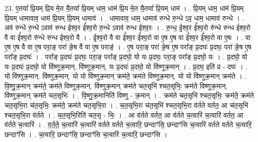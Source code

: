 \documentclass[17pt]{extarticle}
\begin{document}
23. ए॒तया᳚ प्रि॒यम् प्रि॒य मे॒त यै॒तया᳚ प्रि॒यम् धाम॒ धाम॑ प्रि॒य मे॒त यै॒तया᳚ प्रि॒यम् धाम॑ । . प्रि॒यम् धाम॒ धाम॑ प्रि॒यम् प्रि॒यम् धामावाव॒ धाम॑ प्रि॒यम् प्रि॒यम् धामाव॑ । . धामावाव॒ धाम॒ धामाव॑ रुन्धे रु॒न्धे ऽव॒ धाम॒ धामाव॑ रुन्धे । . अव॑ रुन्धे रु॒न्धे ऽवाव॑ रुन्ध ईश्व॒र ई᳚श्व॒रो रु॒न्धे ऽवाव॑ रुन्ध ईश्व॒रः । . रु॒न्ध॒ ई॒श्व॒र ई᳚श्व॒रो रु॑न्धे रुन्ध ईश्व॒रो वै वा ई᳚श्व॒रो रु॑न्धे रुन्ध ईश्व॒रो वै । . ई॒श्व॒रो वै वा ई᳚श्व॒र ई᳚श्व॒रो वा ए॒ष ए॒ष वा ई᳚श्व॒र ई᳚श्व॒रो वा ए॒षः । . वा ए॒ष ए॒ष वै वा ए॒ष परा॒ङ् परा॑ ङे॒ष वै वा ए॒ष पराङ्॑ । . ए॒ष परा॒ङ् परा॑ ङे॒ष ए॒ष परा᳚ङ् प्र॒दघः॑ प्र॒दघः॒ परा॑ ङे॒ष ए॒ष परा᳚ङ् प्र॒दघः॑ । . परा᳚ङ् प्र॒दघः॑ प्र॒दघः॒ परा॒ङ् परा᳚ङ् प्र॒दघो॒ यो यः प्र॒दघः॒ परा॒ङ् परा᳚ङ् प्र॒दघो॒ यः । . प्र॒दघो॒ यो यः प्र॒दघः॑ प्र॒दघो॒ यो वि॑ष्णुक्र॒मान्. वि॑ष्णुक्र॒मान्. यः प्र॒दघः॑ प्र॒दघो॒ यो वि॑ष्णुक्र॒मान् । . प्र॒दघ॒ इति॑ प्र - दघः॑ । . यो वि॑ष्णुक्र॒मान्. वि॑ष्णुक्र॒मान्. यो यो वि॑ष्णुक्र॒मान् क्रम॑ते॒ क्रम॑ते विष्णुक्र॒मान्. यो यो वि॑ष्णुक्र॒मान् क्रम॑ते । . वि॒ष्णु॒क्र॒मान् क्रम॑ते॒ क्रम॑ते विष्णुक्र॒मान्. वि॑ष्णुक्र॒मान् क्रम॑ते चत॒सृभि॑ श्चत॒सृभिः॒ क्रम॑ते विष्णुक्र॒मान्. वि॑ष्णुक्र॒मान् क्रम॑ते चत॒सृभिः॑ । . वि॒ष्णु॒क्र॒मानिति॑ विष्णु - क्र॒मान् । . क्रम॑ते चत॒सृभि॑ श्चत॒सृभिः॒ क्रम॑ते॒ क्रम॑ते चत॒सृभि॒रा च॑त॒सृभिः॒ क्रम॑ते॒ क्रम॑ते चत॒सृभि॒रा । . च॒त॒सृभि॒रा च॑त॒सृभि॑ श्चत॒सृभि॒रा व॑र्तते वर्तत॒ आ च॑त॒सृभि॑ श्चत॒सृभि॒रा व॑र्तते । . च॒त॒सृभि॒रिति॑ चत॒सृ - भिः॒ । . आ व॑र्तते वर्तत॒ आ व॑र्तते च॒त्वारि॑ च॒त्वारि॑ वर्तत॒ आ व॑र्तते च॒त्वारि॑ । . व॒र्त॒ते॒ च॒त्वारि॑ च॒त्वारि॑ वर्तते वर्तते च॒त्वारि॒ छन्दाꣳ॑सि॒ छन्दाꣳ॑सि च॒त्वारि॑ वर्तते वर्तते च॒त्वारि॒ छन्दाꣳ॑सि । . च॒त्वारि॒ छन्दाꣳ॑सि॒ छन्दाꣳ॑सि च॒त्वारि॑ च॒त्वारि॒ छन्दाꣳ॑सि । \newline
\end{document}
